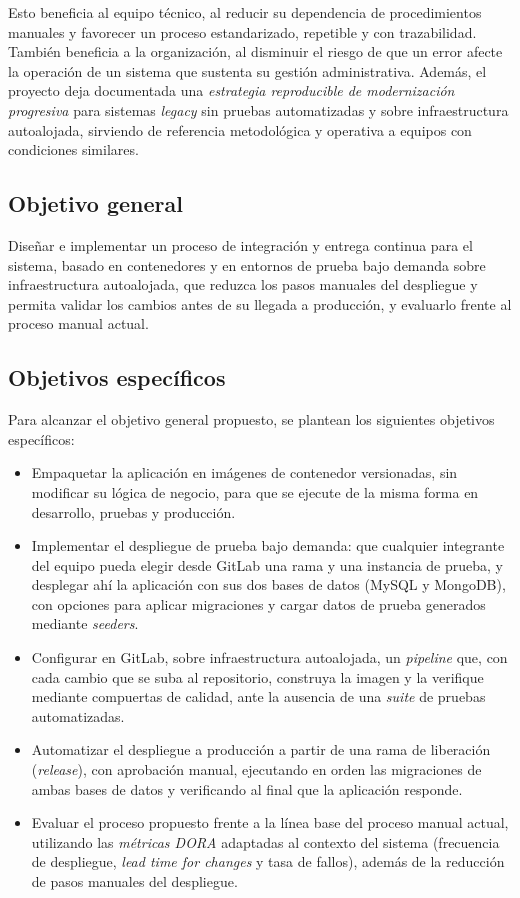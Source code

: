 Esto beneficia al equipo técnico, al reducir su dependencia de procedimientos manuales y
favorecer un proceso estandarizado, repetible y con trazabilidad. También beneficia a la
organización, al disminuir el riesgo de que un error afecte la operación de un sistema que sustenta
su gestión administrativa. Además, el proyecto deja documentada una \emph{estrategia reproducible de
modernización progresiva} para sistemas \emph{legacy} sin pruebas automatizadas y sobre
infraestructura autoalojada, sirviendo de referencia metodológica y operativa a equipos con condiciones similares.

\subsection{Objetivo general}
Diseñar e implementar un proceso de integración y entrega continua para el sistema, basado en
contenedores y en entornos de prueba bajo demanda sobre infraestructura autoalojada, que reduzca
los pasos manuales del despliegue y permita validar los cambios antes de su llegada a producción,
y evaluarlo frente al proceso manual actual.

\subsection{Objetivos específicos}
Para alcanzar el objetivo general propuesto, se plantean los siguientes objetivos específicos:
\begin{itemize}
  \item Empaquetar la aplicación en imágenes de contenedor versionadas, sin modificar su lógica de negocio,
  para que se ejecute de la misma forma en desarrollo, pruebas y producción.

  \item Implementar el despliegue de prueba bajo demanda: que cualquier integrante del equipo pueda
  elegir desde GitLab una rama y una instancia de prueba, y desplegar ahí la aplicación con sus dos
  bases de datos (MySQL y MongoDB), con opciones para aplicar migraciones y cargar datos de prueba
  generados mediante \emph{seeders}.

  \item Configurar en GitLab, sobre infraestructura autoalojada, un \emph{pipeline} que, con cada
  cambio que se suba al repositorio, construya la imagen y la verifique mediante compuertas de calidad,
  ante la ausencia de una \emph{suite} de pruebas automatizadas.

  \item Automatizar el despliegue a producción a partir de una rama de liberación (\emph{release}), con aprobación manual,
  ejecutando en orden las migraciones de ambas bases de datos y verificando al final que la aplicación responde.

  \item Evaluar el proceso propuesto frente a la línea base del proceso manual actual, utilizando las
  \emph{métricas DORA} adaptadas al contexto del sistema (frecuencia de despliegue,
  \emph{lead time for changes} y tasa de fallos), además de la reducción de pasos manuales del despliegue.
\end{itemize}

